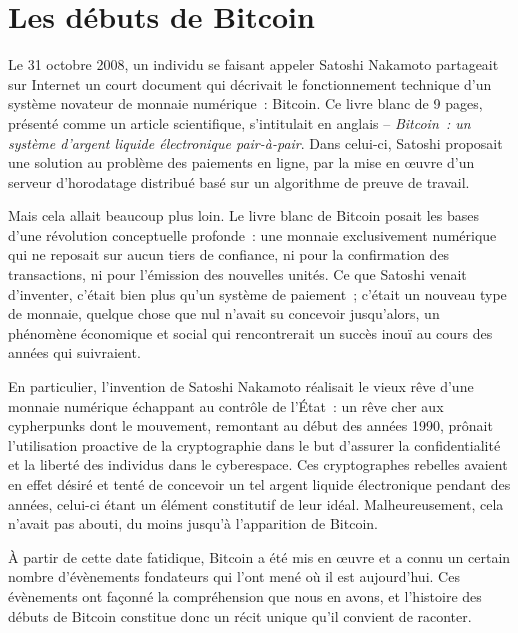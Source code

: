 
\chapter{Les débuts de Bitcoin}
\label{ch:mythe}


Le 31 octobre 2008, un individu se faisant appeler Satoshi Nakamoto partageait sur Internet un court document qui décrivait le fonctionnement technique d'un système novateur de monnaie numérique~: Bitcoin. Ce livre blanc de 9 pages, présenté comme un article scientifique, s'intitulait en anglais  -- \emph{Bitcoin~: un système d'argent liquide électronique pair-à-pair}. Dans celui-ci, Satoshi proposait une solution au problème des paiements en ligne, par la mise en œuvre d'un serveur d'horodatage distribué basé sur un algorithme de preuve de travail.

Mais cela allait beaucoup plus loin. Le livre blanc de Bitcoin posait les bases d'une révolution conceptuelle profonde~: une monnaie exclusivement numérique qui ne reposait sur aucun tiers de confiance, ni pour la confirmation des transactions, ni pour l'émission des nouvelles unités. Ce que Satoshi venait d'inventer, c'était bien plus qu'un système de paiement~; c'était un nouveau type de monnaie, quelque chose que nul n'avait su concevoir jusqu'alors, un phénomène économique et social qui rencontrerait un succès inouï au cours des années qui suivraient.

En particulier, l'invention de Satoshi Nakamoto réalisait le vieux rêve d'une monnaie numérique échappant au contrôle de l'État~: un rêve cher aux cypherpunks dont le mouvement, remontant au début des années 1990, prônait l'utilisation proactive de la cryptographie dans le but d'assurer la confidentialité et la liberté des individus dans le cyberespace. Ces cryptographes rebelles avaient en effet désiré et tenté de concevoir un tel argent liquide électronique pendant des années, celui-ci étant un élément constitutif de leur idéal. Malheureusement, cela n'avait pas abouti, du moins jusqu'à l'apparition de Bitcoin.

À partir de cette date fatidique, Bitcoin a été mis en œuvre et a connu un certain nombre d'évènements fondateurs qui l'ont mené où il est aujourd'hui. Ces évènements ont façonné la compréhension que nous en avons, et l'histoire des débuts de Bitcoin constitue donc un récit unique qu'il convient de raconter.

